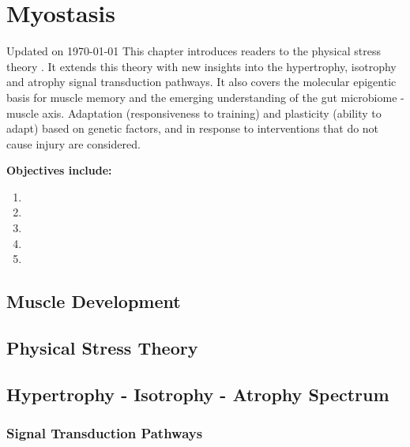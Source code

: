 \chapter{Myostasis}\label{chp:myostasis}
Updated on \today
\minitoc
This chapter introduces readers to the physical stress theory \cite{mueller_tissue_2002}. It extends this theory with new insights into the hypertrophy, isotrophy and atrophy signal transduction pathways. It also covers the molecular epigentic basis for muscle memory and the emerging understanding of the gut microbiome - muscle axis. Adaptation (responsiveness to training) and plasticity (ability to adapt) based on genetic factors, and in response to interventions that do not cause injury are considered.

\vspace{5mm}

\textbf{Objectives include:}
\begin{enumerate}
    \item
    \item
    \item
    \item
    \item
\end{enumerate}

\section{Muscle Development}

\section{Physical Stress Theory}

\section{Hypertrophy - Isotrophy - Atrophy Spectrum}


\subsection{Signal Transduction Pathways}

